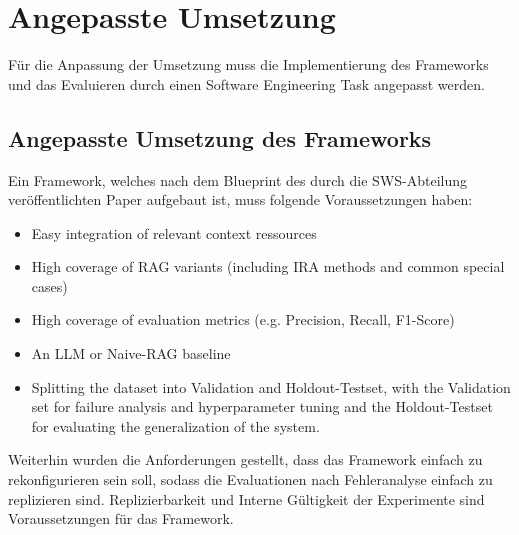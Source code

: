 \documentclass[letterpaper, 10 pt, conference]{ieeeconf}
\begin{document}
\section{Angepasste Umsetzung}
Für die Anpassung der Umsetzung muss die Implementierung des Frameworks und das Evaluieren durch einen Software Engineering Task angepasst werden. \\

\subsection{Angepasste Umsetzung des Frameworks}
Ein Framework, welches nach dem Blueprint des durch die SWS-Abteilung veröffentlichten Paper aufgebaut ist, muss folgende Voraussetzungen haben:\\

\begin{itemize}
   \item Easy integration of relevant context ressources
   \item High coverage of RAG variants (including IRA methods and common special cases)
   \item High coverage of evaluation metrics (e.g. Precision, Recall, F1-Score)
   \item An LLM or Naive-RAG baseline
   \item Splitting the dataset into Validation and Holdout-Testset, with the Validation set for failure analysis and hyperparameter tuning and the Holdout-Testset for evaluating the generalization of the system.\\
\end{itemize}

Weiterhin wurden die Anforderungen gestellt, dass das Framework einfach zu rekonfigurieren sein soll, sodass die Evaluationen nach Fehleranalyse einfach zu replizieren sind. 
Replizierbarkeit und Interne Gültigkeit der Experimente sind Voraussetzungen für das Framework. 
\end{document}
